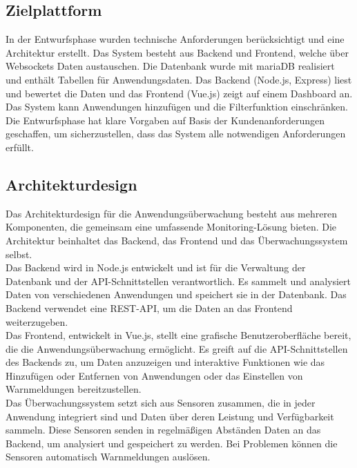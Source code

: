\begin{flushleft}
\subsection{Zielplattform}
In der Entwurfsphase wurden technische Anforderungen berücksichtigt und eine Architektur erstellt.
Das System besteht aus Backend und Frontend, welche über Websockets Daten austauschen.
Die Datenbank wurde mit mariaDB realisiert und enthält Tabellen für Anwendungsdaten.
Das Backend (Node.js, Express) liest und bewertet die Daten und das Frontend (Vue.js) zeigt auf einem Dashboard an.
Das System kann Anwendungen hinzufügen und die Filterfunktion einschränken.
Die Entwurfsphase hat klare Vorgaben auf Basis der Kundenanforderungen geschaffen, um sicherzustellen,
dass das System alle notwendigen Anforderungen erfüllt.



\subsection{Architekturdesign}
Das Architekturdesign für die Anwendungsüberwachung besteht aus mehreren Komponenten, die gemeinsam eine umfassende Monitoring-Lösung bieten. Die Architektur beinhaltet das Backend, das Frontend und das Überwachungssystem selbst.
\\
Das Backend wird in Node.js entwickelt und ist für die Verwaltung der Datenbank und der API-Schnittstellen verantwortlich. Es sammelt und analysiert Daten von verschiedenen Anwendungen und speichert sie in der Datenbank. Das Backend verwendet eine REST-API, um die Daten an das Frontend weiterzugeben.
\\
Das Frontend, entwickelt in Vue.js, stellt eine grafische Benutzeroberfläche bereit, die die Anwendungsüberwachung ermöglicht. Es greift auf die API-Schnittstellen des Backends zu, um Daten anzuzeigen und interaktive Funktionen wie das Hinzufügen oder Entfernen von Anwendungen oder das Einstellen von Warnmeldungen bereitzustellen.
\\
Das Überwachungssystem setzt sich aus Sensoren zusammen, die in jeder Anwendung integriert sind und Daten über deren Leistung und Verfügbarkeit sammeln. Diese Sensoren senden in regelmäßigen Abständen Daten an das Backend, um analysiert und gespeichert zu werden. Bei Problemen können die Sensoren automatisch Warnmeldungen auslösen.



\end{flushleft}
